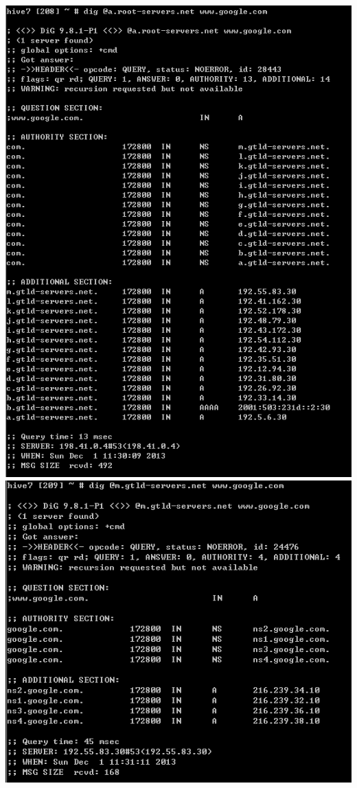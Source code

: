 \documentclass[11pt]{article}
\begin{document}
\includegraphics[scale=0.38]{122-hw3-2}\\
\includegraphics[scale=0.38]{122-hw3-3}\\
\end{document}
